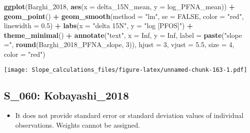 \documentclass[
]{article}
\newenvironment{Shaded}{\begin{snugshade}}{\end{snugshade}}
\newcommand{\AttributeTok}[1]{\textcolor[rgb]{0.13,0.29,0.53}{#1}}
\newcommand{\ConstantTok}[1]{\textcolor[rgb]{0.56,0.35,0.01}{#1}}
\newcommand{\DecValTok}[1]{\textcolor[rgb]{0.00,0.00,0.81}{#1}}
\newcommand{\FloatTok}[1]{\textcolor[rgb]{0.00,0.00,0.81}{#1}}
\newcommand{\FunctionTok}[1]{\textcolor[rgb]{0.13,0.29,0.53}{\textbf{#1}}}
\newcommand{\NormalTok}[1]{#1}
\newcommand{\SpecialCharTok}[1]{\textcolor[rgb]{0.81,0.36,0.00}{\textbf{#1}}}
\newcommand{\StringTok}[1]{\textcolor[rgb]{0.31,0.60,0.02}{#1}}
\providecommand{\tightlist}{%
  \setlength{\itemsep}{0pt}\setlength{\parskip}{0pt}}
\begin{document}
\begin{Shaded}
\begin{Highlighting}[]
\FunctionTok{ggplot}\NormalTok{(Barghi\_2018, }\FunctionTok{aes}\NormalTok{(}\AttributeTok{x =}\NormalTok{ delta\_15N\_mean, }\AttributeTok{y =}\NormalTok{ log\_PFNA\_mean)) }\SpecialCharTok{+}
  \FunctionTok{geom\_point}\NormalTok{() }\SpecialCharTok{+}
  \FunctionTok{geom\_smooth}\NormalTok{(}\AttributeTok{method =} \StringTok{"lm"}\NormalTok{, }\AttributeTok{se =} \ConstantTok{FALSE}\NormalTok{, }\AttributeTok{color =} \StringTok{"red"}\NormalTok{, }\AttributeTok{linewidth =} \FloatTok{0.5}\NormalTok{) }\SpecialCharTok{+}
  \FunctionTok{labs}\NormalTok{(}\AttributeTok{x =} \StringTok{"delta 15N"}\NormalTok{,}
       \AttributeTok{y =} \StringTok{"log [PFOS]"}\NormalTok{) }\SpecialCharTok{+}
  \FunctionTok{theme\_minimal}\NormalTok{() }\SpecialCharTok{+}
  \FunctionTok{annotate}\NormalTok{(}\StringTok{"text"}\NormalTok{, }\AttributeTok{x =} \ConstantTok{Inf}\NormalTok{, }\AttributeTok{y =} \ConstantTok{Inf}\NormalTok{, }\AttributeTok{label =} \FunctionTok{paste}\NormalTok{(}\StringTok{"slope ="}\NormalTok{, }\FunctionTok{round}\NormalTok{(Barghi\_2018\_PFNA\_slope, }\DecValTok{3}\NormalTok{)), }
           \AttributeTok{hjust =} \DecValTok{3}\NormalTok{, }\AttributeTok{vjust =} \FloatTok{5.5}\NormalTok{, }\AttributeTok{size =} \DecValTok{4}\NormalTok{, }\AttributeTok{color =} \StringTok{"red"}\NormalTok{)}
\end{Highlighting}
\end{Shaded}

\texttt{[image: Slope\_calculations\_files/figure-latex/unnamed-chunk-163-1.pdf]}

\subsection{S\_060: Kobayashi\_2018}\label{s_060-kobayashi_2018-1}

\begin{itemize}
\tightlist
\item
  It does not provide standard error or standard deviation values of
  individual observations. Weights cannot be assigned.
\end{itemize}
\end{document}
